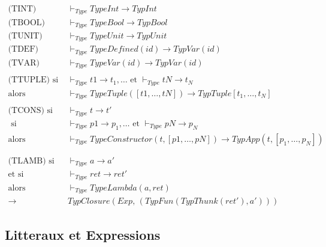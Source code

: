 \documentclass[
  12pt,
]{article}
\begin{document}
\begin{align*}
  \text{(TINT)}               & \vdash_{Type} TypeInt \rightarrow  TypInt                                               \\
  \text{(TBOOL)}              & \vdash_{Type} TypeBool \rightarrow  TypBool                                             \\
  \text{(TUNIT)}              & \vdash_{Type} TypeUnit \rightarrow  TypUnit                                             \\
  \text{(TDEF)}               & \vdash_{Type} TypeDefined(id) \rightarrow  TypVar(id)                                   \\
  \text{(TVAR)}               & \vdash_{Type} TypeVar(id) \rightarrow  TypVar (id)                                      \\
  \\
  \text{(TTUPLE)} \text{ si } & \vdash_{Type} t1 \rightarrow  t_1,\dots \text{ et }  \vdash_{Type} tN \rightarrow  t_N  \\
  \text{alors}                & \vdash_{Type} TypeTuple([t1,\dots, tN]) \rightarrow  TypTuple[t_1,\dots,t_N]            \\
  \\
  \text{(TCONS)} \text{ si }  & \vdash_{Type} t \rightarrow  t'                                                         \\
  \text{ si }                 & \vdash_{Type} p1 \rightarrow  p_1,\dots \text{ et } \vdash_{Type} pN \rightarrow  p_N   \\
  \text{alors}                & \vdash_{Type} TypeConstructor(t, [p1,\dots,pN]) \rightarrow  TypApp(t, [p_1,\dots,p_N]) \\
  \\
  \\
  \text{(TLAMB)} \text{ si }  & \vdash_{Type} a \rightarrow  a'                                                         \\
  \text{et si}                & \vdash_{Type} ret  \rightarrow  ret'                                                    \\
  \text{alors}                & \vdash_{Type} TypeLambda(a,ret)                                                         \\
  \rightarrow \;              & TypClosure(Exp, \, (TypFun(TypThunk(ret'), a')))
\end{align*}

\hypertarget{litteraux-et-expressions}{%
  \subsection{Litteraux et Expressions}\label{litteraux-et-expressions}}
\end{document}
